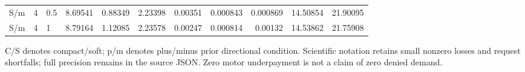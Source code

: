 \begin{table}[htbp]
\begin{tabular}{lllrrrrrrrr}
S/m & 4 & 0.5 & 8.69541 & 0.88349 & 2.23398 & 0.00351 & 0.000843 & 0.000869 & 14.50854 & 21.90095 \\
S/m & 4 & 1 & 8.79164 & 1.12085 & 2.23578 & 0.00247 & 0.000814 & 0.00132 & 14.53862 & 21.75908 \\
\bottomrule\end{tabular}
\par\smallskip\raggedright C/S denotes compact/soft; p/m denotes plus/minus prior directional condition. Scientific notation retains small nonzero losses and request shortfalls; full precision remains in the source JSON. Zero motor underpayment is not a claim of zero denied demand.
\end{table}
